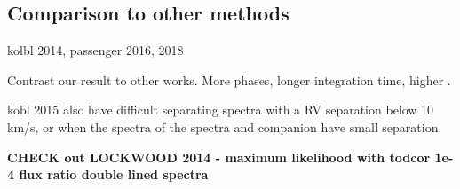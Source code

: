 \subsection{Comparison to other methods}
kolbl 2014, passenger 2016, 2018

Contrast our result to other works.
More phases, longer integration time, higher {\snr{}}.



kobl 2015 also have difficult separating spectra with a {RV} separation below 10 km/s, or when the spectra of the spectra and companion have small separation.\todo{}


\textbf{
    CHECK out LOCKWOOD 2014 - maximum likelihood with todcor 1e-4 flux ratio double lined spectra}

